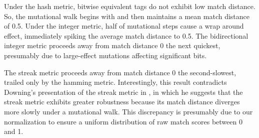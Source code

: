 Under the hash metric, bitwise equivalent tags do not exhibit low match distance.
So, the mutational walk begins with and then maintains a mean match distance of 0.5.
Under the integer metric, half of mutational steps cause a wrap around effect, immediately spiking the average match distance to 0.5.
The bidirectional integer metric proceeds away from match distance 0 the next quickest, presumably due to large-effect mutations affecting significant bits. %

The streak metric proceeds away from match distance 0 the second-slowest, trailed only by the hamming metric. %
Interestingly, this result contradicts Downing's presentation of the streak metric in \citep{downing2015intelligence}, in which he suggests that the streak metric exhibits greater robustness because its match distance diverges more slowly under a mutational walk.
This discrepancy is presumably due to our normalization to ensure a uniform distribution of raw match scores between 0 and 1.


